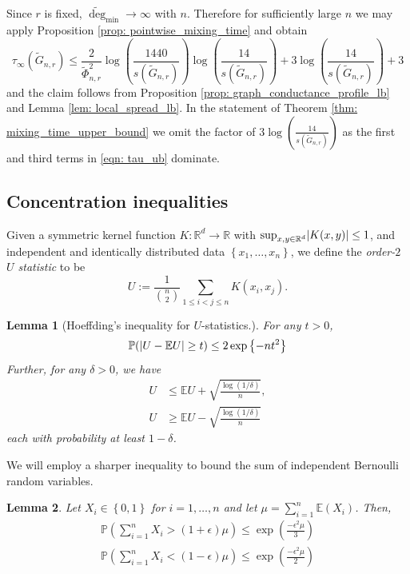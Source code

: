 \documentclass{article}
\DeclarePairedDelimiter\abs{\lvert}{\rvert}
\newcommand{\set}[1]{\left\{#1\right\}}
\newcommand{\Reals}{\mathbb{R}}
\newcommand{\Rd}{\Reals^d}
\newcommand{\1}{\mathbf{1}}
\newcommand{\Pbb}{\mathbb{P}}
\newcommand{\Ebb}{\mathbb{E}}
\newcommand{\degminwt}{\widetilde{\deg}_{\min}}
\theoremstyle{aldenthm}
\newtheorem{lemma}{Lemma}
\theoremstyle{aldenrmrk}
\begin{document}
Since $r$ is fixed, $\degminwt \to \infty$ with $n$. Therefore for sufficiently large $n$ we may apply Proposition \ref{prop: pointwise_mixing_time} and obtain
\begin{equation}
\label{eqn: tau_ub}
\tau_{\infty}(\widetilde{G}_{n,r}) \leq \frac{2}{\widetilde{\Phi}_{n,r}^2} \log\left(\frac{1440}{s(\widetilde{G}_{n,r})}\right) \log \left(\frac{14}{s(\widetilde{G}_{n,r})}\right) + 3 \log\left(\frac{14}{s(\widetilde{G}_{n,r})}\right) + 3
\end{equation}
and the claim follows from Proposition \ref{prop: graph_conductance_profile_lb} and Lemma \ref{lem: local_spread_lb}. In the statement of Theorem \ref{thm: mixing_time_upper_bound} we omit the factor of $3 \log\left(\frac{14}{s(\widetilde{G}_{n,r})}\right)$ as the first and third terms in \eqref{eqn: tau_ub} dominate.

\subsection{Concentration inequalities}
\label{sec: concentration}

Given a symmetric kernel function $K: \Rd \to \Reals$ with $\sup_{x,y \in \Rd} \abs{K(x,y)} \leq 1$, and independent and identically distributed data $\set{x_1, \ldots, x_n}$, we define the \textit{order-$2$ $U$ statistic} to be 
\begin{equation*}
U := \frac{1}{ {n \choose 2} } \sum_{1 \leq i < j \leq n} K(x_i,x_j).
\end{equation*}

\begin{lemma}[Hoeffding's inequality for $U$-statistics.]
	\label{lem: bounded_difference}
	For any $t > 0$,
	\begin{equation*}
	\mathbb{P}(\abs{U - \mathbb{E}U} \geq t) \leq 2 \exp\left\{-nt^2\right\}
	\end{equation*}
	Further, for any $\delta > 0$, we have
	\begin{align*}
	U & \leq \mathbb{E}U + \sqrt{\frac{\log(1 / \delta)}{n} }, \\
	U & \geq \mathbb{E}U - \sqrt{\frac{\log(1 / \delta)}{n} }
	\end{align*}
	each with probability at least $1 - \delta$. 
\end{lemma}

We will employ a sharper inequality to bound the sum of independent Bernoulli random variables.
\begin{lemma}
	\label{lem: multiplicative_Hoeffding}
	Let $X_i \in \set{0,1}$ for $i = 1, \ldots, n$ and let $\mu = \sum_{i = 1}^n \Ebb(X_i)$. Then,
	\begin{align*}
	\Pbb\left(\sum_{i=1}^{n}X_i > (1 + \epsilon) \mu \right) \leq \exp \left(\frac{-\epsilon^2 \mu}{3}\right) \\
	\Pbb\left(\sum_{i=1}^{n}X_i < (1 - \epsilon) \mu \right) \leq \exp \left(\frac{-\epsilon^2 \mu}{2}\right)
	\end{align*}
\end{lemma}
\end{document}
